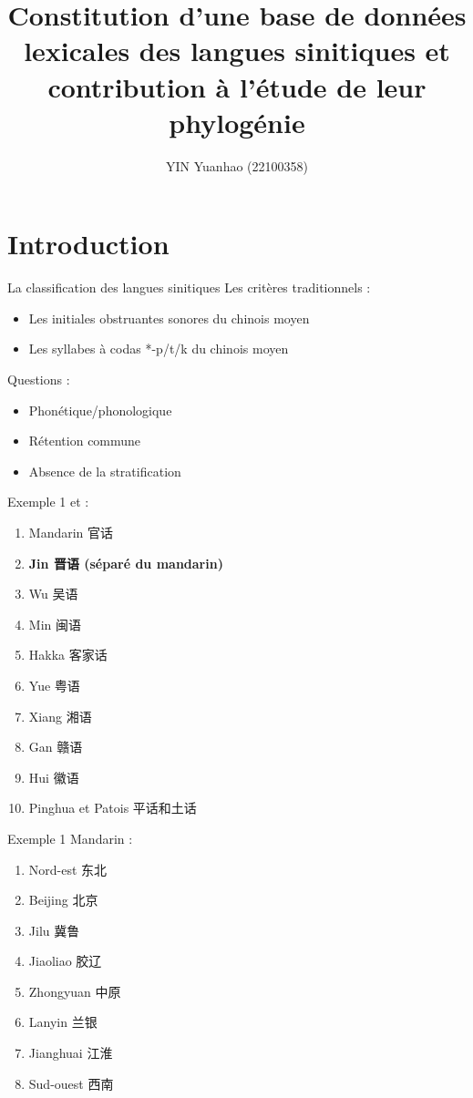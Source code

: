\documentclass[11pt]{beamer}
\title{Constitution d'une base de données lexicales des langues sinitiques et contribution à l'étude de leur phylogénie}
\author{YIN Yuanhao (22100358)}
\institute{INALCO, SDL (M2) 

Parcours : Linguistique : langues, terrains, variations, typologie
}
\date{}
\begin{document}
\begin{frame}
\titlepage
\end{frame}

\begin{frame}
\tableofcontents
\end{frame}

\section{Introduction}
\begin{frame}{La classification des langues sinitiques}
Les critères traditionnels : 
\begin{itemize}
\item{Les initiales obstruantes sonores du chinois moyen}

\item{Les syllabes à codas *-p/t/k du chinois moyen}
\end{itemize}

Questions :
\begin{itemize}
\item{Phonétique/phonologique}

\item{Rétention commune}

\item{Absence de la stratification}
\end{itemize}
\end{frame}


\begin{frame}{Exemple 1}
\textcite{li1987atlas} et \textcite{xiong2012atlas} : 
\begin{enumerate}
\item{Mandarin 官话}
\item{\textbf{Jin 晋语 (séparé du mandarin)}}
\item{Wu 吴语}
\item{Min 闽语}
\item{Hakka 客家话}
\item{Yue 粤语}
\item{Xiang 湘语}
\item{Gan 赣语}
\item{Hui 徽语}
\item{Pinghua et Patois 平话和土话}
\end{enumerate}
\end{frame}

\begin{frame}{Exemple 1}
Mandarin :
\begin{enumerate}
\item{Nord-est 东北}
\item{Beijing 北京}
\item{Jilu 冀鲁}
\item{Jiaoliao 胶辽}
\item{Zhongyuan 中原}
\item{Lanyin 兰银}
\item{Jianghuai 江淮}
\item{Sud-ouest 西南}
\end{enumerate}
\end{frame}
\end{document}
